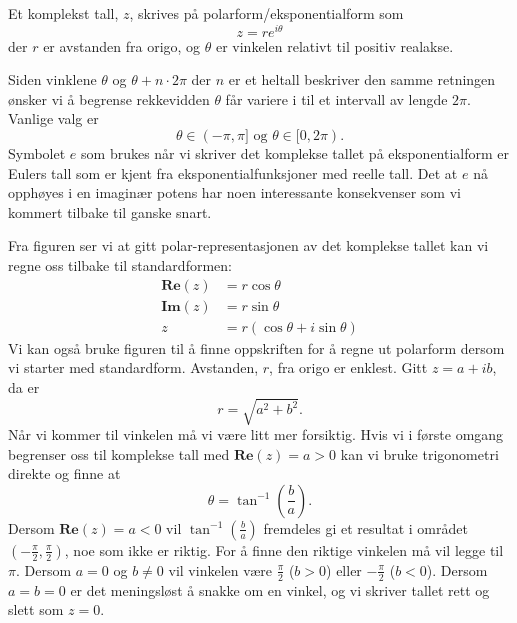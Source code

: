 \documentclass[a4paper,norsk,12pt]{article}
\begin{document}
\begin{tdef}
Et komplekst tall, $z$, skrives på polarform/eksponentialform som 
\begin{displaymath}
	z = re^{i\theta}
\end{displaymath}
der $r$ er avstanden fra origo, og $\theta$ er vinkelen relativt til positiv realakse. 
\end{tdef}
\noindent
Siden vinklene $\theta$ og $\theta+n\cdot 2\pi$ der $n$ er et heltall beskriver den samme retningen ønsker vi å begrense rekkevidden $\theta$ får variere i til et intervall av lengde $2\pi$. Vanlige valg er
\begin{displaymath}
	\theta \in (-\pi, \pi] \text{ og } \theta \in [0, 2\pi).
\end{displaymath}
Symbolet $e$ som brukes når vi skriver det komplekse tallet på eksponentialform er Eulers tall som er kjent fra eksponentialfunksjoner med reelle tall. Det at $e$ nå opphøyes i en imaginær potens har noen interessante konsekvenser som vi kommert tilbake til ganske snart.

Fra figuren ser vi at gitt polar-representasjonen av det komplekse tallet kan vi regne oss tilbake til standardformen:
\begin{align*}
	\mathbf{Re}(z) &= r\cos\theta \\
	\mathbf{Im}(z) &= r\sin\theta \\
	z &= r(\cos\theta + i\sin\theta) 
\end{align*}
Vi kan også bruke figuren til å finne oppskriften for å regne ut polarform dersom vi starter med standardform. Avstanden, $r$, fra origo er enklest. Gitt $z=a + ib$, da er
\begin{displaymath}
	r = \sqrt{a^2 + b^2}.
\end{displaymath}
Når vi kommer til vinkelen må vi være litt mer forsiktig. Hvis vi i første omgang begrenser oss til komplekse tall med $\mathbf{Re}(z)=a>0$ kan vi bruke trigonometri direkte og finne at
\begin{displaymath}
	\theta = \tan^{-1}\left(\frac{b}{a}\right).
\end{displaymath}
Dersom $\mathbf{Re}(z) = a <0$ vil $\tan^{-1}\left(\frac{b}{a}\right)$ fremdeles gi et resultat i området $\left(-\frac{\pi}{2},\frac{\pi}{2}\right)$, noe som ikke er riktig. For å finne den riktige vinkelen må vil legge til $\pi$. Dersom $a=0$ og $b\neq0$ vil vinkelen være $\frac{\pi}{2}$ ($b>0$) eller $-\frac{\pi}{2}$ ($b<0$). Dersom $a=b=0$ er det meningsløst å snakke om en vinkel, og vi skriver tallet rett og slett som $z=0$.
\end{document}
